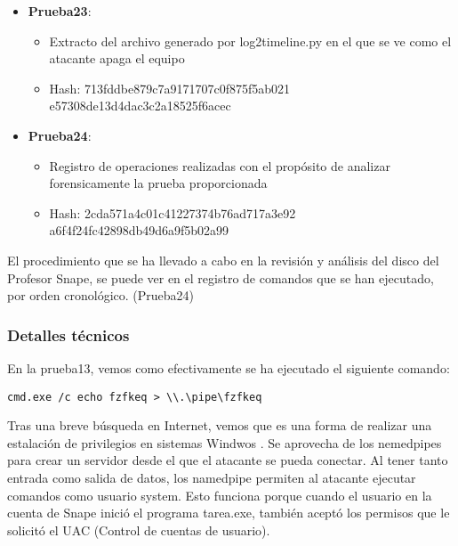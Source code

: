 \begin{itemize}
{\begin{itemize}
    \end{itemize}}
  \item{\textbf{Prueba23}: 
    \begin{itemize}
      \item{Extracto del archivo generado por log2timeline.py en el que se ve como el atacante apaga el equipo}
      \item{Hash}: 713fddbe879c7a9171707c0f875f5ab021\\e57308de13d4dac3c2a18525f6acec
    \end{itemize}}
  \item{\textbf{Prueba24}: 
    \begin{itemize}
      \item{Registro de operaciones realizadas con el propósito de analizar forensicamente la prueba proporcionada}
      \item{Hash}: 2cda571a4c01c41227374b76ad717a3e92\\a6f4f24fc42898db49d6a9f5b02a99
    \end{itemize}}

\end{itemize}

El procedimiento que se ha llevado a cabo en la revisión y análisis del disco del Profesor Snape, se puede ver en el registro de comandos que se han ejecutado, por orden cronológico. (Prueba24)

\subsubsection{Detalles técnicos}

En la prueba13, vemos como efectivamente se ha ejecutado el siguiente comando:
\begin{lstlisting}
cmd.exe /c echo fzfkeq > \\.\pipe\fzfkeq
\end{lstlisting}

Tras una breve búsqueda en Internet, vemos que es una forma de realizar una estalación de privilegios en sistemas Windwos \cite{meterpreter}.
Se aprovecha de los nemedpipes \cite{namedpipe} para crear un servidor desde el que el atacante se pueda conectar.
Al tener tanto entrada como salida de datos, los namedpipe permiten al atacante ejecutar comandos como usuario system.
Esto funciona porque cuando el usuario en la cuenta de Snape inició el programa tarea.exe, también aceptó los permisos que le solicitó el UAC (Control de cuentas de usuario).

